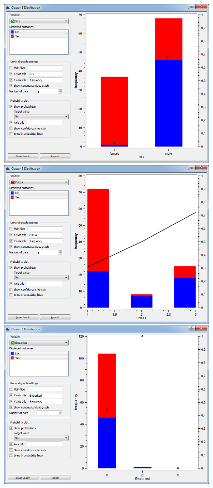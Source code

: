 \documentclass[a4paper,11pt]{article}
\begin{document}
\begin{figure}[h]
	\centering
	\begin{center}
		\includegraphics[scale=0.25]{ClusterDistribution/Cluster3/Sex}
		\includegraphics[scale=0.25]{ClusterDistribution/Cluster3/PClass}\\
		\vspace{1 mm}
		\includegraphics[scale=0.25]{ClusterDistribution/Cluster3/Embarked}

\end{center}
\end{figure}
\end{document}
